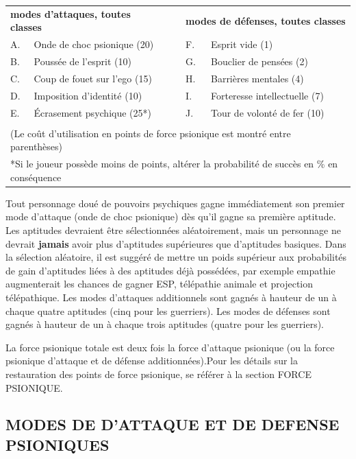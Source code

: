 \documentclass[11pt]{article}
\begin{document}
{{\parindent0.5cm
\begin{tabular}{llcll}
\multicolumn{2}{l}{\textbf{modes d'attaques, toutes classes}} && \multicolumn{2}{l}{\textbf{modes de défenses, toutes classes}} \\
A. & Onde de choc psionique (20)  && F. & Esprit vide (1) \\
B. & Poussée de l'esprit (10) 	  && G. & Bouclier de pensées (2) \\
C. & Coup de fouet sur l'ego (15) && H. & Barrières mentales (4) \\
D. & Imposition d'identité (10)   && I. & Forteresse intellectuelle (7) \\
E. & Écrasement psychique (25*)   && J. & Tour de volonté de fer (10) \\
&&&& \\
\multicolumn{5}{p{15cm}}{(Le coût d'utilisation en points de force psionique est montré entre parenthèses)} \\
\multicolumn{5}{p{15cm}}{*Si le joueur possède moins de points, altérer la probabilité de succès en \% en conséquence} \\
\end{tabular}}

\medskip

Tout personnage doué de pouvoirs psychiques gagne immédiatement son premier mode d'attaque (onde de choc psionique) dès qu'il gagne sa première aptitude. Les aptitudes devraient être sélectionnées aléatoirement, mais un personnage ne devrait \textbf{jamais} avoir plus d'aptitudes supérieures que d'aptitudes basiques. Dans la sélection aléatoire, il est suggéré de mettre un poids supérieur aux probabilités de gain d'aptitudes liées à des aptitudes déjà possédées, par exemple empathie augmenterait les chances de gagner ESP, télépathie animale et projection télépathique. Les modes d'attaques additionnels sont gagnés à hauteur de un à chaque quatre aptitudes (cinq pour les guerriers). Les modes de défenses sont gagnés à hauteur de un à chaque trois aptitudes (quatre pour les guerriers).

\bigskip

La force psionique totale est deux fois la force d'attaque psionique (ou la force psionique d'attaque et de défense additionnées).Pour les détails sur la restauration des points de force psionique, se référer à la section FORCE PSIONIQUE. %

\subsection*{\normalsize MODES DE D'ATTAQUE ET DE DEFENSE PSIONIQUES}

}
\end{document}
